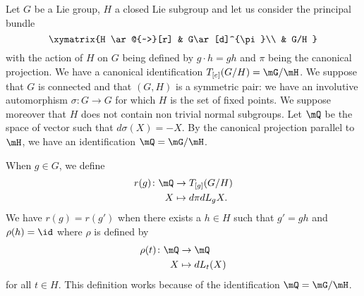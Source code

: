 Let $G$ be a Lie group, $H$ a closed Lie subgroup and let us consider the principal bundle
\begin{equation}
\xymatrix{%
   H \ar@{~>}[r]		&	G\ar[d]^{\pi}\\
   				&	G/H
 }
\end{equation}
with the action of $H$ on $G$ being defined by $g\cdot h=gh$ and $\pi$ being the canonical projection. We have a canonical identification $T_{[e]}(G/H)=\mG/\mH$. We suppose that $G$ is connected and that $(G,H)$ is a symmetric pair: we have an involutive automorphism $\sigma\colon G\to G$ for which $H$ is the set of fixed points. We suppose moreover that $H$ does not contain non trivial normal subgroups. Let $\mQ$ be the space of vector such that $d\sigma(X)=-X$. By the canonical projection parallel to $\mH$, we have an identification $\mQ=\mG/\mH$.

When $g\in G$, we define
\begin{equation}
\begin{aligned}
 r(g)\colon \mQ&\to T_{[g]}(G/H) \\
  X&\mapsto d\pi dL_gX.
\end{aligned}
\end{equation}
We have $r(g)=r(g')$ when there exists a $h\in H$ such that $g'=gh$ and $\rho(h)=\id$ where $\rho$ is defined by
\begin{equation}
\begin{aligned}
 \rho(t)\colon \mQ&\to \mQ \\
  X&\mapsto dL_t(X)
\end{aligned}
\end{equation}
for all $t\in H$. This definition works because of the identification $\mQ=\mG/\mH$.
